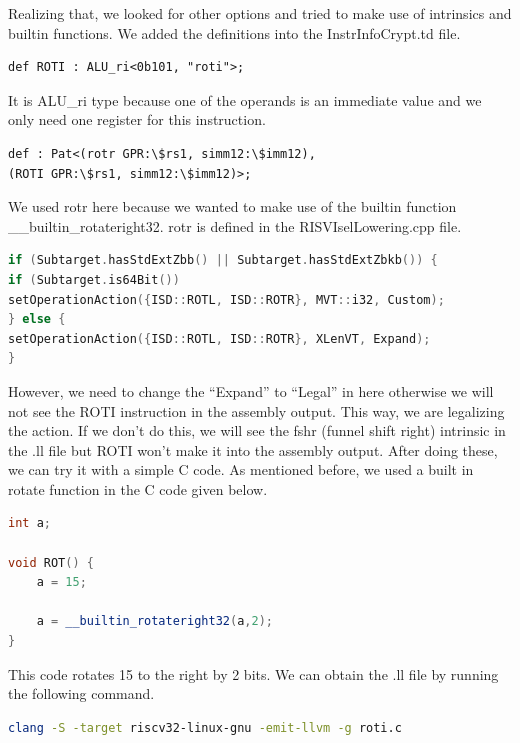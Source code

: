Realizing that, we looked for other options and tried to make use of intrinsics and builtin functions. We added the definitions into the InstrInfoCrypt.td file.

\begin{lstlisting}
def ROTI : ALU_ri<0b101, "roti">;
\end{lstlisting}

It is ALU\_ri type because one of the operands is an immediate value and we only need one register for this instruction.

\begin{lstlisting}
def : Pat<(rotr GPR:\$rs1, simm12:\$imm12),
(ROTI GPR:\$rs1, simm12:\$imm12)>;
\end{lstlisting}

We used rotr here because we wanted to make use of the builtin function \_\_builtin\_rotateright32. rotr is defined in the RISVIselLowering.cpp file.

\begin{lstlisting}[language=C++]
if (Subtarget.hasStdExtZbb() || Subtarget.hasStdExtZbkb()) {
if (Subtarget.is64Bit())
setOperationAction({ISD::ROTL, ISD::ROTR}, MVT::i32, Custom);
} else {
setOperationAction({ISD::ROTL, ISD::ROTR}, XLenVT, Expand); 
}
\end{lstlisting}

However, we need to change the “Expand” to “Legal” in here otherwise we will not see the ROTI instruction in the assembly output.  This way, we are legalizing the action. If we don’t do this, we will see the fshr (funnel shift right) intrinsic in the .ll file but ROTI won’t make it into the assembly output. After doing these, we can try it with a simple C code. As mentioned before, we used a built in rotate function in the C code given below. 

\begin{lstlisting}[language=C++]
int a;

void ROT() {
	a = 15;
	
	a = __builtin_rotateright32(a,2);	
}
\end{lstlisting}

This code rotates 15 to the right by 2 bits. We can obtain the .ll file by running the following command.

\begin{lstlisting}[language=Bash]
clang -S -target riscv32-linux-gnu -emit-llvm -g roti.c
\end{lstlisting}

